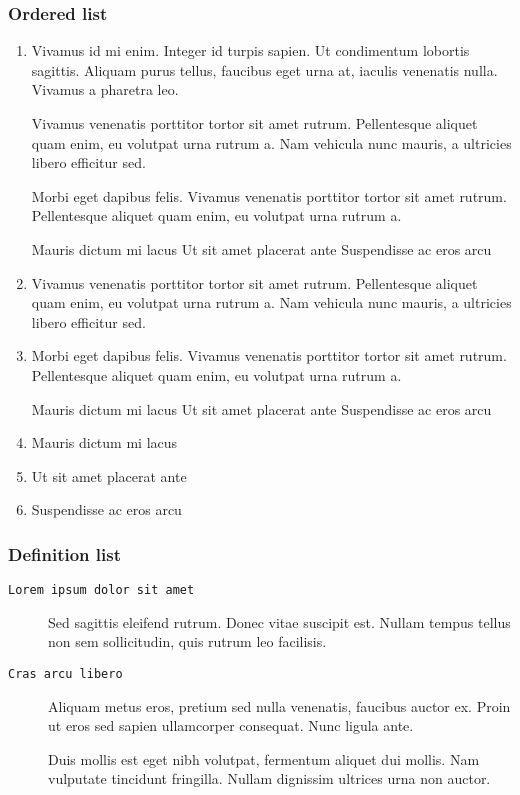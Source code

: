 \documentclass[a4paper]{article}
\begin{document}
\subsubsection{Ordered list}
\begin{enumerate}
\item
Vivamus id mi enim. Integer id turpis sapien. Ut condimentum lobortis
      sagittis. Aliquam purus tellus, faucibus eget urna at, iaculis venenatis
      nulla. Vivamus a pharetra leo.



Vivamus venenatis porttitor tortor sit amet rutrum. Pellentesque aliquet
          quam enim, eu volutpat urna rutrum a. Nam vehicula nunc mauris, a
          ultricies libero efficitur sed.



Morbi eget dapibus felis. Vivamus venenatis porttitor tortor sit amet
          rutrum. Pellentesque aliquet quam enim, eu volutpat urna rutrum a.


Mauris dictum mi lacus
Ut sit amet placerat ante
Suspendisse ac eros arcu




\item
Vivamus venenatis porttitor tortor sit amet rutrum. Pellentesque aliquet
          quam enim, eu volutpat urna rutrum a. Nam vehicula nunc mauris, a
          ultricies libero efficitur sed.


\item
Morbi eget dapibus felis. Vivamus venenatis porttitor tortor sit amet
          rutrum. Pellentesque aliquet quam enim, eu volutpat urna rutrum a.


Mauris dictum mi lacus
Ut sit amet placerat ante
Suspendisse ac eros arcu


\item Mauris dictum mi lacus
\item Ut sit amet placerat ante
\item Suspendisse ac eros arcu
\end{enumerate}

\subsubsection{Definition list}
\begin{description}

\item[\texttt{Lorem ipsum dolor sit amet}]

Sed sagittis eleifend rutrum. Donec vitae suscipit est. Nullam tempus
      tellus non sem sollicitudin, quis rutrum leo facilisis.



\item[\texttt{Cras arcu libero}]

Aliquam metus eros, pretium sed nulla venenatis, faucibus auctor ex. Proin
      ut eros sed sapien ullamcorper consequat. Nunc ligula ante.

Duis mollis est eget nibh volutpat, fermentum aliquet dui mollis.
      Nam vulputate tincidunt fringilla.
      Nullam dignissim ultrices urna non auctor.



\end{description}
\end{document}
